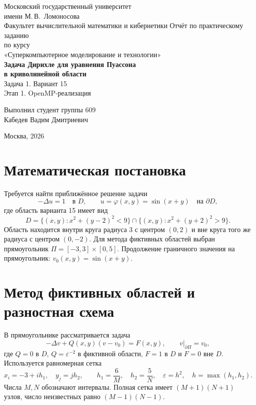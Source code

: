 \documentclass[12pt,a4paper]{article}
\begin{document}
\begin{titlepage}
\begin{center}
Московский государственный университет\\имени М.\,В.~Ломоносова\\[6mm]
Факультет вычислительной математики и кибернетики
\vfill
{\large Отчёт по практическому заданию\\по курсу\\[3mm]
«Суперкомпьютерное моделирование и технологии»}\\[15mm]
{\Large\bfseries Задача Дирихле для уравнения Пуассона\\[3mm]в криволинейной области}\\[8mm]
{\large Задача 1. Вариант 15\\[4mm]Этап 1. OpenMP-реализация}
\vfill
\begin{flushright}
Выполнил студент группы 609\\
Кабедев Вадим Дмитриевич
\end{flushright}
\vfill
Москва, 2026
\end{center}
\end{titlepage}
\setcounter{page}{2}

\section{Математическая постановка}
Требуется найти приближённое решение задачи
\[
-\Delta u=1\quad\text{в }D,\qquad
u=\varphi(x,y)=\sin(x+y)\quad\text{на }\partial D,
\]
где область варианта 15 имеет вид
\[
D=\{(x,y):x^2+(y-2)^2<9\}
\cap\{(x,y):x^2+(y+2)^2>9\}.
\]
Область находится внутри круга радиуса 3 с центром $(0,2)$ и вне круга того же радиуса с центром $(0,-2)$. Для метода фиктивных областей выбран прямоугольник
$\Pi=[-3,3]\times[0,5]$.
Продолжение граничного значения на прямоугольник:
$v_0(x,y)=\sin(x+y)$.

\section{Метод фиктивных областей и разностная схема}
В прямоугольнике рассматривается задача
\[
-\Delta v+Q(x,y)(v-v_0)=F(x,y),\qquad v|_{\partial\Pi}=v_0,
\]
где $Q=0$ в $D$, $Q=\varepsilon^{-2}$ в фиктивной области,
$F=1$ в $D$ и $F=0$ вне $D$.
Используется равномерная сетка
\[
x_i=-3+ih_1,\quad y_j=jh_2,\qquad
h_1=\frac6M,\quad h_2=\frac5N,\quad
\varepsilon=h^2,\quad h=\max(h_1,h_2).
\]
Числа $M,N$ обозначают интервалы. Полная сетка имеет
$(M+1)(N+1)$ узлов, число неизвестных равно $(M-1)(N-1)$.
\end{document}
